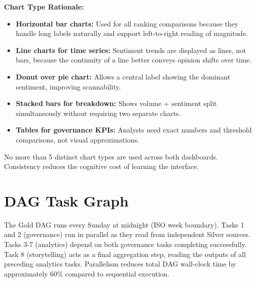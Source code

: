 \documentclass[12pt, a4paper]{article}
\begin{document}
\textbf{Chart Type Rationale:}
\begin{itemize}
    \item \textbf{Horizontal bar charts:} Used for all ranking comparisons because they handle long labels naturally and support left-to-right reading of magnitude.
    \item \textbf{Line charts for time series:} Sentiment trends are displayed as lines, not bars, because the continuity of a line better conveys opinion shifts over time.
    \item \textbf{Donut over pie chart:} Allows a central label showing the dominant sentiment, improving scannability.
    \item \textbf{Stacked bars for breakdown:} Shows volume + sentiment split simultaneously without requiring two separate charts.
    \item \textbf{Tables for governance KPIs:} Analysts need exact numbers and threshold comparisons, not visual approximations.
\end{itemize}
No more than 5 distinct chart types are used across both dashboards. Consistency reduces the cognitive cost of learning the interface.

\section{DAG Task Graph}
The Gold DAG runs every Sunday at midnight (ISO week boundary). Tasks 1 and 2 (governance) run in parallel as they read from independent Silver sources. Tasks 3-7 (analytics) depend on both governance tasks completing successfully. Task 8 (storytelling) acts as a final aggregation step, reading the outputs of all preceding analytics tasks. Parallelism reduces total DAG wall-clock time by approximately 60\% compared to sequential execution.
\end{document}

